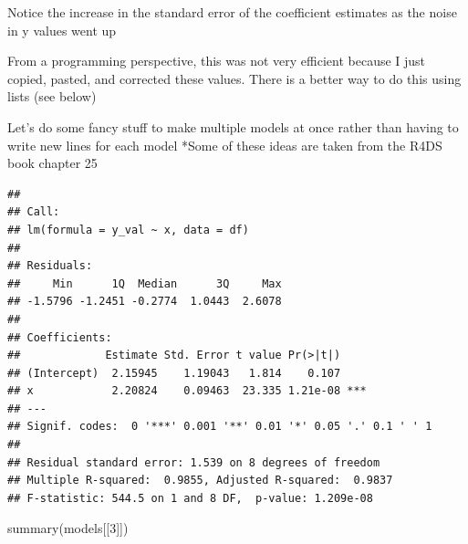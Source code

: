\documentclass[
]{book}
\newenvironment{Shaded}{\begin{snugshade}}{\end{snugshade}}
\newcommand{\AttributeTok}[1]{\textcolor[rgb]{0.77,0.63,0.00}{#1}}
\newcommand{\ControlFlowTok}[1]{\textcolor[rgb]{0.13,0.29,0.53}{\textbf{#1}}}
\newcommand{\DecValTok}[1]{\textcolor[rgb]{0.00,0.00,0.81}{#1}}
\newcommand{\FunctionTok}[1]{\textcolor[rgb]{0.00,0.00,0.00}{#1}}
\newcommand{\NormalTok}[1]{#1}
\newcommand{\OtherTok}[1]{\textcolor[rgb]{0.56,0.35,0.01}{#1}}
\newcommand{\SpecialCharTok}[1]{\textcolor[rgb]{0.00,0.00,0.00}{#1}}
\begin{document}
Notice the increase in the standard error of the coefficient estimates as the noise in y values went up

From a programming perspective, this was not very efficient because I just copied, pasted, and corrected these values.
There is a better way to do this using lists (see below)

Let's do some fancy stuff to make multiple models at once rather than having to write new lines for each model
*Some of these ideas are taken from the R4DS book chapter 25

\begin{Shaded}
\end{Shaded}

\begin{verbatim}
## 
## Call:
## lm(formula = y_val ~ x, data = df)
## 
## Residuals:
##     Min      1Q  Median      3Q     Max 
## -1.5796 -1.2451 -0.2774  1.0443  2.6078 
## 
## Coefficients:
##             Estimate Std. Error t value Pr(>|t|)    
## (Intercept)  2.15945    1.19043   1.814    0.107    
## x            2.20824    0.09463  23.335 1.21e-08 ***
## ---
## Signif. codes:  0 '***' 0.001 '**' 0.01 '*' 0.05 '.' 0.1 ' ' 1
## 
## Residual standard error: 1.539 on 8 degrees of freedom
## Multiple R-squared:  0.9855, Adjusted R-squared:  0.9837 
## F-statistic: 544.5 on 1 and 8 DF,  p-value: 1.209e-08
\end{verbatim}

\begin{Shaded}
\begin{Highlighting}[]
\FunctionTok{summary}\NormalTok{(models[[}\DecValTok{3}\NormalTok{]])}
\end{Highlighting}
\end{Shaded}
\end{document}
